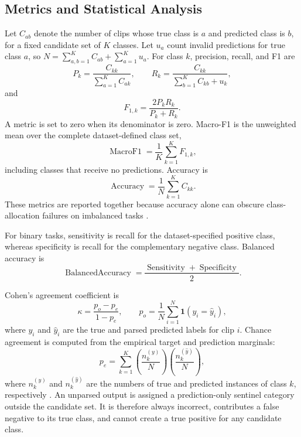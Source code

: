 \subsection{Metrics and Statistical Analysis}
\label{sec:supp_metrics}

Let $C_{ab}$ denote the number of clips whose true class is $a$ and
predicted class is $b$, for a fixed candidate set of $K$ classes.
Let $u_a$ count invalid predictions for true class $a$, so $N=\sum_{a,b=1}^{K}C_{ab}+\sum_{a=1}^{K}u_a$. For class $k$, precision, recall, and F1 are
\begin{equation}
P_k=\frac{C_{kk}}{\sum_{a=1}^{K}C_{ak}},\qquad
R_k=\frac{C_{kk}}{\sum_{b=1}^{K}C_{kb}+u_k},
\end{equation}
and
\begin{equation}
F_{1,k}=\frac{2P_kR_k}{P_k+R_k}.
\end{equation}
A metric is set to zero when its denominator is zero. Macro-F1 is the
unweighted mean over the complete dataset-defined class set,
\begin{equation}
\operatorname{MacroF1}
    =\frac{1}{K}\sum_{k=1}^{K}F_{1,k},
\end{equation}
including classes that receive no predictions. Accuracy is
\begin{equation}
\operatorname{Accuracy}
    =\frac{1}{N}\sum_{k=1}^{K}C_{kk}.
\end{equation}
These metrics are reported together because accuracy alone can obscure
class-allocation failures on imbalanced tasks
\cite{opitz2019macro,sokolova2009performance}.

For binary tasks, sensitivity is recall for the dataset-specified
positive class, whereas specificity is recall for the complementary
negative class. Balanced accuracy is
\begin{equation}
\operatorname{BalancedAccuracy}
    =\frac{\operatorname{Sensitivity}
            +\operatorname{Specificity}}{2}.
\end{equation}

Cohen's agreement coefficient is
\begin{equation}
\kappa=\frac{p_o-p_e}{1-p_e},
\qquad
p_o=\frac{1}{N}\sum_{i=1}^{N}
        \mathbf{1}(y_i=\hat y_i),
\end{equation}
where $y_i$ and $\hat y_i$ are the true and parsed predicted labels for
clip $i$. Chance agreement is computed from the empirical target and
prediction marginals:
\begin{equation}
p_e=\sum_{k=1}^{K}
\left(\frac{n_k^{(y)}}{N}\right)
\left(\frac{n_k^{(\hat y)}}{N}\right),
\end{equation}
where $n_k^{(y)}$ and $n_k^{(\hat y)}$ are the numbers of true and
predicted instances of class $k$, respectively
\cite{cohen1968weighted}. An unparsed output is assigned a
prediction-only sentinel category outside the candidate set. It is
therefore always incorrect, contributes a false negative to its true
class, and cannot create a true positive for any candidate class.

